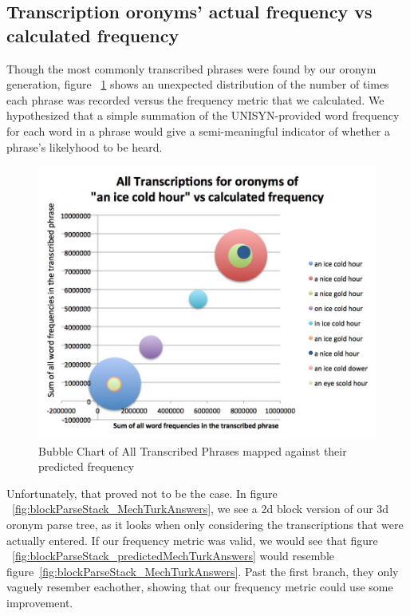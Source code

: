 \subsection{Transcription oronyms' actual frequency vs calculated frequency}

Though the most commonly transcribed phrases were found by our oronym generation, figure ~\ref{fig:AllTranscriptionsBubbleChart} shows an unexpected distribution of the number of times each phrase was recorded versus the frequency metric that we calculated. We hypothesized that a simple summation of the UNISYN-provided word frequency for each word in a phrase would give a semi-meaningful indicator of whether a phrase's likelyhood to be heard.  

\begin{figure}
\includegraphics[width=150mm]{AllTranscriptionsBubbleChart.jpg}
\captionfonts
\caption[Bubble Chart of All Transcribed Phrases mapped against their predicted frequency]{Bubble Chart of All Transcribed Phrases mapped against their predicted frequency}
\label{fig:AllTranscriptionsBubbleChart}
\end{figure}


Unfortunately, that proved not to be the case.  In figure ~\ref{fig:blockParseStack_MechTurkAnswers}, we see a 2d block version of our 3d oronym parse tree, as it looks when only considering the transcriptions that were actually entered. If our frequency metric was valid, we would see that figure ~\ref{fig:blockParseStack_predictedMechTurkAnswers} would resemble figure~\ref{fig:blockParseStack_MechTurkAnswers}.  Past the first branch, they only vaguely resember eachother, showing that our frequency metric could use some improvement. 


